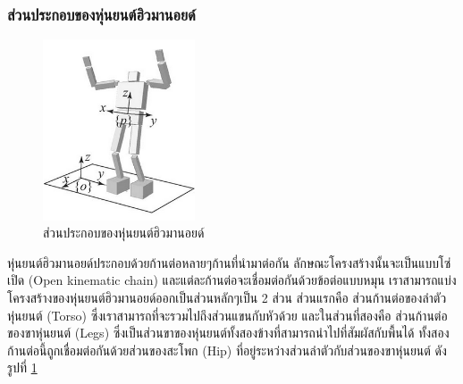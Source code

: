 \subsubsection{ส่วนประกอบของหุ่นยนต์ฮิวมานอยด์}
\begin{figure}[ht]
	\centering
	\includegraphics[width=0.4\textwidth]{chapter2/images/robot_component.png}
	\caption{ส่วนประกอบของหุ่นยนต์ฮิวมานอยด์}
	\label{fig:robot_component}
\end{figure}
หุ่นยนต์ฮิวมานอยด์ประกอบด้วยก้านต่อหลายๆก้านที่นำมาต่อกัน ลักษณะโครงสร้างนั้นจะเป็นแบบโซ่เปิด (Open kinematic chain)
และแต่ละก้านต่อจะเชื่อมต่อกันด้วยข้อต่อแบบหมุน เราสามารถแบ่งโครงสร้างของหุ่นยนต์ฮิวมานอยด์ออกเป็นส่วนหลักๆเป็น 2 ส่วน ส่วนแรกคือ
ส่วนก้านต่อของลำตัวหุ่นยนต์ (Torso) ซึ่งเราสามารถที่จะรวมไปถึงส่วนแขนกับหัวด้วย
และในส่วนที่สองคือ ส่วนก้านต่อของขาหุ่นยนต์ (Legs) ซึ่งเป็นส่วนขาของหุ่นยนต์ทั้งสองข้างที่สามารถนำไปที่สัมผัสกับพื้นได้
ทั้งสองก้านต่อนี้ถูกเชื่อมต่อกันด้วยส่วนของสะโพก (Hip) ที่อยู่ระหว่างส่วนลำตัวกับส่วนของขาหุ่นยนต์ ดังรูปที่ \ref{fig:robot_component}

